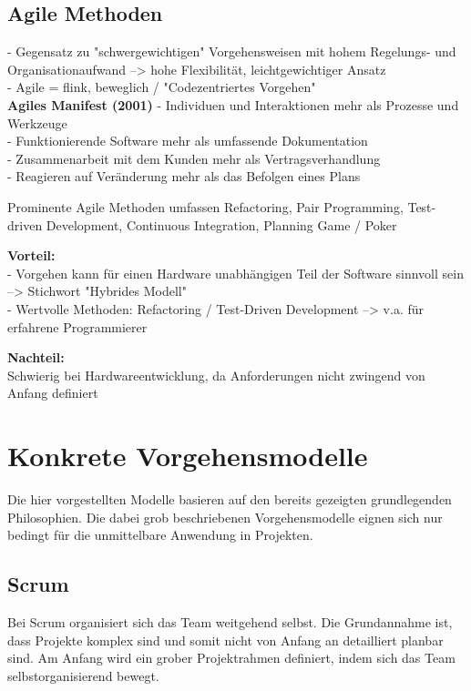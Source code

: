 \subsection{Agile Methoden}
-  Gegensatz zu "schwergewichtigen" 
	Vorgehensweisen mit hohem Regelungs- und Organisationaufwand --> hohe Flexibilität, leichtgewichtiger Ansatz \\
- Agile = flink, beweglich / "Codezentriertes Vorgehen" \\

\textbf{Agiles Manifest (2001)}
- Individuen und Interaktionen mehr als 
Prozesse und Werkzeuge \\
- Funktionierende Software mehr als 
umfassende Dokumentation \\
- Zusammenarbeit mit dem Kunden mehr als 
Vertragsverhandlung \\
- Reagieren auf Veränderung mehr als das 
Befolgen eines Plans

Prominente Agile Methoden umfassen Refactoring, Pair Programming, Test-driven Development, Continuous Integration, Planning Game / Poker

\textbf{Vorteil:} \\
- Vorgehen kann für einen Hardware unabhängigen Teil der Software sinnvoll sein --> Stichwort "Hybrides Modell" \\
- Wertvolle Methoden: Refactoring / Test-Driven Development --> v.a. für erfahrene Programmierer

\textbf{Nachteil:} \\
Schwierig bei Hardwareentwicklung, da Anforderungen nicht zwingend von Anfang definiert

\section{Konkrete Vorgehensmodelle}
Die hier vorgestellten Modelle basieren auf den bereits gezeigten grundlegenden Philosophien. Die dabei grob beschriebenen Vorgehensmodelle eignen sich nur bedingt für die unmittelbare 
Anwendung in Projekten.


\subsection{Scrum}

Bei Scrum organisiert sich das Team weitgehend selbst. Die Grundannahme ist, dass Projekte komplex sind und somit nicht von Anfang an detailliert planbar sind. Am Anfang wird ein grober Projektrahmen definiert, indem sich das Team selbstorganisierend bewegt.

